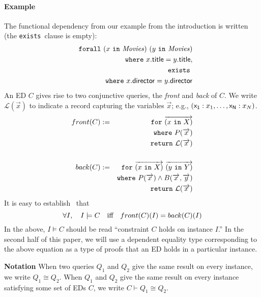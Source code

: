 \documentclass{sigplanconf}
\newcommand{\FOR}{{\tt for}\relax\ifmmode\ \else\xspace\fi}
\newcommand{\FORALL}{{\tt forall}\relax\ifmmode\ \else\xspace\fi}
\newcommand{\EXISTS}{{\tt exists}\relax\ifmmode\ \else\xspace\fi}
\newcommand{\WHERE}{{\tt where}\relax\ifmmode\ \else\xspace\fi}
\newcommand{\IN}{ \ {\tt in} \ }
\newcommand{\RETURN}{{\tt return}\relax\ifmmode\ \else\xspace\fi}
\newcommand{\relation}[1]{\ensuremath{\mathit{#1}}\xspace}
\begin{document}
\paragraph{Example}
The functional dependency from our example from the introduction is written (the \EXISTS clause is empty):
\begin{eqnarray*}
& & \FORALL (x \IN \relation{Movies}) \ (y \IN \relation{Movies}) \\
& & \WHERE x.{\sf title} = y.{\sf title}, \\ 
& & \EXISTS \\
& & \WHERE x.{\sf director} = y.{\sf director}
\end{eqnarray*}
An ED $C$ gives rise to two conjunctive queries, the {\it front} and {\it back} of $C$.  We write $\mathcal{L}
(\overrightarrow{x})$ to indicate a record capturing the variables $\overrightarrow{x}
$; e.g., $({\sf x_1}: x_1, \ldots ,{\sf x_N}: x_N)$.  %
\begin{eqnarray*}
front(C)& := & \FOR \overrightarrow{(x \IN X)} \\ 
& & \WHERE P(\overrightarrow{x}) \\
& & \RETURN \mathcal{L}(\overrightarrow{x})  \\
& & \\
back(C) & := & \FOR \overrightarrow{(x \IN X)} \ \overrightarrow{(y \IN Y)} \\ 
& & \WHERE P(\overrightarrow{x}) \wedge B(\overrightarrow{x}, \overrightarrow{y}) \\
& & \RETURN \mathcal{L}(\overrightarrow{x})
\end{eqnarray*}
It is easy to establish~\cite{Popa99anequational} that 
\[
\forall I, \quad I \models C \quad \textnormal{iff} \quad front(C)(I) = back(C)(I)
\]
In the above, $I \models C$ should be read ``constraint $C$ holds on instance $I$.''
In the second half of this paper, we will use a dependent equality type corresponding to the above equation as a type of proofs that an ED holds in a particular instance.

\textbf{Notation}  When two queries $Q_1$ and $Q_2$ give the same result on every instance, we write $Q_1 \cong Q_2$.  When $Q_1$ and $Q_2$ give the same result on every instance satisfying some set of EDs $C$, we write $C \vdash Q_1 \cong Q_2$.  
\end{document}
